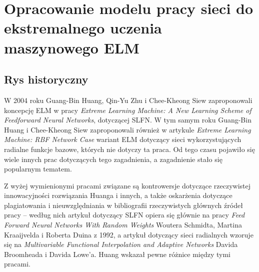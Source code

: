 \documentclass{article}
\begin{document}
\section{Opracowanie modelu pracy sieci do ekstremalnego uczenia maszynowego ELM}
\subsection{Rys historyczny}
W 2004 roku Guang-Bin Huang, Qin-Yu Zhu i Chee-Kheong Siew zaproponowali koncepcję ELM w pracy \textit{Extreme Learning Machine: A New Learning Scheme of Feedforward Neural Networks}, dotyczącej SLFN. W tym samym roku Guang-Bin Huang i Chee-Kheong Siew zaproponowali również w artykule \textit{Extreme Learning Machine: RBF Network Case} wariant ELM dotyczący sieci wykorzystujących radialne funkcje bazowe, których nie dotyczy ta praca. Od tego czasu pojawiło się wiele innych prac dotyczących tego zagadnienia, a zagadnienie stało się popularnym tematem. \par
Z wyżej wymienionymi pracami związane są kontrowersje dotyczące rzeczywistej innowacyjności rozwiązania Huanga i innych, a także oskarżenia dotyczące plagiatowania i nieuwzględniania w bibliografii rzeczywistych głównych źródeł pracy -- według nich artykuł dotyczący SLFN opiera się głównie na pracy \textit{Feed Forward Neural Networks With Random Weights} Woutera Schmidta, Martina Kraaijvelda i Roberta Duina z 1992, a artykuł dotyczący sieci radialnych wzoruje się na \textit{Multivariable Functional Interpolation and Adaptive Networks} Davida Broomheada i Davida Lowe'a. Huang wskazał pewne różnice między tymi pracami.
\end{document}
